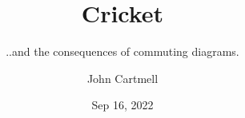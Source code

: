 
\usepackage{mathptmx}
\usepackage{amsfonts}
\usepackage{wasysym}
\usepackage{url}
\usepackage{hyperref}

\newcommand{\SharedMacros}{../../SharedMacros}
\newcommand{\SharedText}{../../SharedText}




   


%
%
%
%

\renewcommand{\erpictureFolder}[0]{../../SharedPictures}
\setcounter{equation}{0}



\title[John Cartmell]{Cricket}
\subtitle{..and the consequences of commuting diagrams.}
\author{John Cartmell}
\institute{\\}
\date{Sep 16, 2022}

\usepackage{framed}
\usepackage{bibentry}
\usepackage{colortbl}
\usepackage{ulem}   %
\usepackage{listings}
\usepackage{arydshln} %
\usepackage{pst-arrow} %
\usepackage{hhline}



\newcommand{\CItreemode}{D}  %
\newcommand{\CItreesep}{2cm}  %

\newcommand{\slidecontext}{Introduction} %

